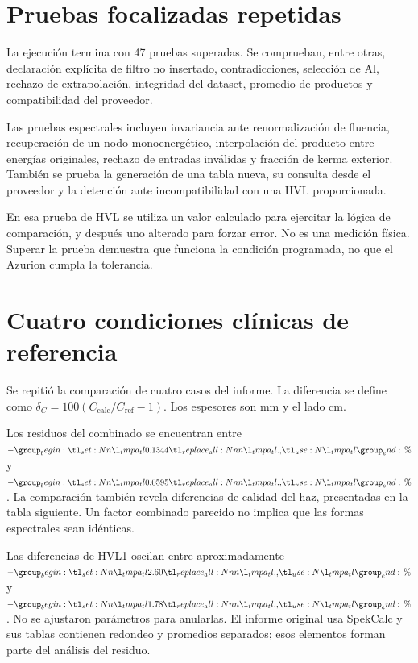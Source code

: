 \section{Pruebas focalizadas repetidas}
La ejecución  termina con 47 pruebas superadas. Se comprueban, entre otras, declaración explícita de filtro no insertado, contradicciones, selección de Al, rechazo de extrapolación, integridad del dataset, promedio de productos y compatibilidad del proveedor.

Las pruebas espectrales incluyen invariancia ante renormalización de fluencia, recuperación de un nodo monoenergético, interpolación del producto entre energías originales, rechazo de entradas inválidas y fracción de kerma exterior. También se prueba la generación de una tabla nueva, su consulta desde el proveedor y la detención ante incompatibilidad con una HVL proporcionada.

En esa prueba de HVL se utiliza un valor calculado para ejercitar la lógica de comparación, y después uno alterado para forzar error. No es una medición física. Superar la prueba demuestra que funciona la condición programada, no que el Azurion cumpla la tolerancia.

\section{Cuatro condiciones clínicas de referencia}
Se repitió la comparación de cuatro casos del informe. La diferencia se define como $\delta_C=100(C_{\mathrm{calc}}/C_{\mathrm{ref}}-1)$. Los espesores son mm y el lado cm.
\begin{table}[htbp]\centering\small
\caption{Comparación parcial del factor combinado con productos clínicos publicados.}

\end{table}
Los residuos del combinado se encuentran entre $-\num{0.1344}\,\text{\char37}$ y $-\num{0.0595}\,\text{\char37}$. La comparación también revela diferencias de calidad del haz, presentadas en la tabla siguiente. Un factor combinado parecido no implica que las formas espectrales sean idénticas.
\begin{table}[htbp]\centering\small
\caption{Comparación de HVL1 en las mismas cuatro condiciones.}

\end{table}
Las diferencias de HVL1 oscilan entre aproximadamente $-\num{2.60}\,\text{\char37}$ y $-\num{1.78}\,\text{\char37}$. No se ajustaron parámetros para anularlas. El informe original usa SpekCalc y sus tablas contienen redondeo y promedios separados; esos elementos forman parte del análisis del residuo.

